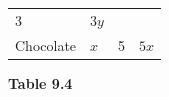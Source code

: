 {\begin{mdframed}[linewidth=4, leftmargin=40, rightmargin=40]
\begin{exercise}
\begin{enumerate}[noitemsep, label=\textbf{Step} \textbf{\arabic*}. ]
{{\begin{center}
\begin{xtabular}[t]{|l|l|l|l|}
    
        3 &
    
    
        
                  \begin{math}3y\end{math}
     \tabularnewline{}
    
    
        Chocolate &
    
    
        
                  \begin{math}x\end{math}
                 &
    
    
        5 &
    
    
        
                  \begin{math}5x\end{math}
     \tabularnewline{}
    \end{xtabular}
      \end{center}
    \begin{center}{\small\bfseries Table 9.4}\end{center}
    
}}
\end{enumerate}
\end{exercise}
\end{mdframed}}
